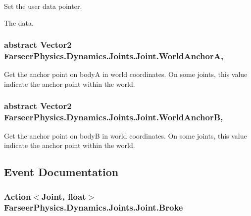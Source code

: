 Set the user data pointer. 

The data.\hypertarget{class_farseer_physics_1_1_dynamics_1_1_joints_1_1_joint_a58837c0ff61a2e98ae532d9be154a08f}{
\subsubsection[{World\+Anchor\+A}]{\setlength{\rightskip}{0pt plus 5cm}abstract Vector2 Farseer\+Physics.\+Dynamics.\+Joints.\+Joint.\+World\+Anchor\+A\hspace{0.3cm}{\ttfamily [get]}, {\ttfamily [set]}}}\label{class_farseer_physics_1_1_dynamics_1_1_joints_1_1_joint_a58837c0ff61a2e98ae532d9be154a08f}


Get the anchor point on body\+A in world coordinates. On some joints, this value indicate the anchor point within the world. 

\hypertarget{class_farseer_physics_1_1_dynamics_1_1_joints_1_1_joint_afd3cafa4220f3ac2091b4357ded5bffb}{
\subsubsection[{World\+Anchor\+B}]{\setlength{\rightskip}{0pt plus 5cm}abstract Vector2 Farseer\+Physics.\+Dynamics.\+Joints.\+Joint.\+World\+Anchor\+B\hspace{0.3cm}{\ttfamily [get]}, {\ttfamily [set]}}}\label{class_farseer_physics_1_1_dynamics_1_1_joints_1_1_joint_afd3cafa4220f3ac2091b4357ded5bffb}


Get the anchor point on body\+B in world coordinates. On some joints, this value indicate the anchor point within the world. 



\subsection{Event Documentation}
\hypertarget{class_farseer_physics_1_1_dynamics_1_1_joints_1_1_joint_aaf2b3615a95b0e3d40083b1fd886af74}{
\subsubsection[{Broke}]{\setlength{\rightskip}{0pt plus 5cm}Action$<${\bf Joint}, float$>$ Farseer\+Physics.\+Dynamics.\+Joints.\+Joint.\+Broke}}\label{class_farseer_physics_1_1_dynamics_1_1_joints_1_1_joint_aaf2b3615a95b0e3d40083b1fd886af74}


